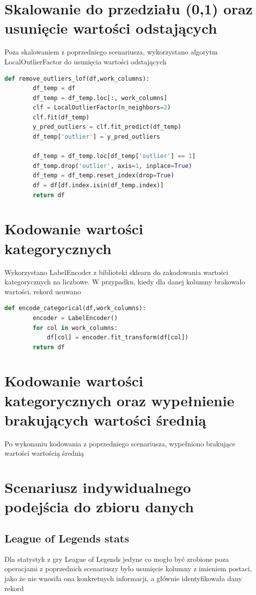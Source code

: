 \documentclass{book}
\begin{document}
\section{Skalowanie do przedziału (0,1) oraz usunięcie 
wartości odstających}
Poza skalowaniem z poprzedniego scenariusza, 
wykorzystano algorytm LocalOutlierFactor do usunięcia 
wartości odstających

\begin{lstlisting}[language=Python, caption={Usuwanie wartości 
    odstających}, captionpos=b]
    def remove_outliers_lof(df,work_columns):
        df_temp = df
        df_temp = df_temp.loc[:, work_columns]
        clf = LocalOutlierFactor(n_neighbors=2)
        clf.fit(df_temp)
        y_pred_outliers = clf.fit_predict(df_temp)
        df_temp['outlier'] = y_pred_outliers

        df_temp = df_temp.loc[df_temp['outlier'] == 1]
        df_temp.drop('outlier', axis=1, inplace=True)
        df_temp = df_temp.reset_index(drop=True)
        df = df[df.index.isin(df_temp.index)]
        return df
\end{lstlisting}

\section{Kodowanie wartości kategorycznych}
Wykorzystano LabelEncoder z biblioteki sklearn do 
zakodowania wartości kategorycznych na liczbowe. 
W przypadku, kiedy dla danej kolumny brakowało wartości, 
rekord usuwano

\begin{lstlisting}[language=Python, caption={Usuwanie wartości 
    odstających}, captionpos=b]
    def encode_categorical(df,work_columns):
        encoder = LabelEncoder()
        for col in work_columns:
            df[col] = encoder.fit_transform(df[col])
        return df
\end{lstlisting}

\section{Kodowanie wartości kategorycznych oraz wypełnienie 
brakujących wartości średnią}
Po wykonaniu kodowania z poprzedniego scenariusza, 
wypełniono brakujące wartości wartością średnią
\section{Scenariusz indywidualnego podejścia do zbioru danych}
\subsection{League of Legends stats}
Dla statystyk z gry League of Legends jedyne co mogło być zrobione 
poza operacjami z poprzednich scenariuszy było usunięcie kolumny z 
imieniem postaci, jako że nie wnosiła ona konkretnych informacji, 
a głównie identyfikowała dany rekord
\end{document}
